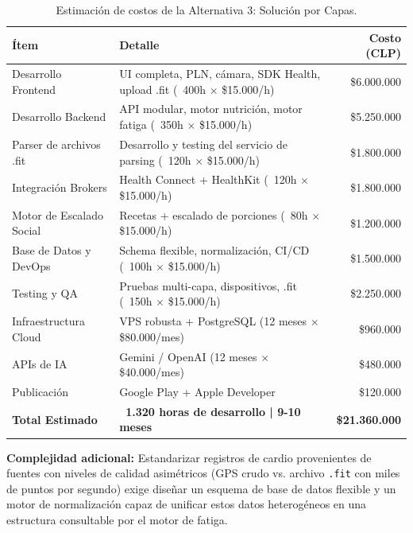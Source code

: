 \documentclass[12pt]{article}
\begin{document}
\begin{table}[h!]
    \centering
    \renewcommand{\arraystretch}{1.4}
    \begin{tabular}{|m{4cm}|m{5.5cm}|r|}
        \hline
        \rowcolor[HTML]{EFEFEF}
        \textbf{Ítem} & \textbf{Detalle} & \textbf{Costo (CLP)} \\ \hline
        Desarrollo Frontend & UI completa, PLN, cámara, SDK Health, upload .fit (~400h $\times$ \$15.000/h) & \$6.000.000 \\ \hline
        Desarrollo Backend & API modular, motor nutrición, motor fatiga (~350h $\times$ \$15.000/h) & \$5.250.000 \\ \hline
        Parser de archivos .fit & Desarrollo y testing del servicio de parsing (~120h $\times$ \$15.000/h) & \$1.800.000 \\ \hline
        Integración Brokers & Health Connect + HealthKit (~120h $\times$ \$15.000/h) & \$1.800.000 \\ \hline
        Motor de Escalado Social & Recetas + escalado de porciones (~80h $\times$ \$15.000/h) & \$1.200.000 \\ \hline
        Base de Datos y DevOps & Schema flexible, normalización, CI/CD (~100h $\times$ \$15.000/h) & \$1.500.000 \\ \hline
        Testing y QA & Pruebas multi-capa, dispositivos, .fit (~150h $\times$ \$15.000/h) & \$2.250.000 \\ \hline
        Infraestructura Cloud & VPS robusta + PostgreSQL (12 meses $\times$ \$80.000/mes) & \$960.000 \\ \hline
        APIs de IA & Gemini / OpenAI (12 meses $\times$ \$40.000/mes) & \$480.000 \\ \hline
        Publicación & Google Play + Apple Developer & \$120.000 \\ \hline
        \rowcolor[HTML]{E8F5E9}
        \textbf{Total Estimado} & \textbf{~1.320 horas de desarrollo | 9-10 meses} & \textbf{\$21.360.000} \\ \hline
    \end{tabular}
    \caption{Estimación de costos de la Alternativa 3: Solución por Capas.}
    \label{tab:costos_alt3}
\end{table}

\textbf{Complejidad adicional:} Estandarizar registros de cardio provenientes de fuentes con niveles de calidad asimétricos (GPS crudo vs. archivo \texttt{.fit} con miles de puntos por segundo) exige diseñar un esquema de base de datos flexible y un motor de normalización capaz de unificar estos datos heterogéneos en una estructura consultable por el motor de fatiga.
\newpage
\end{document}
